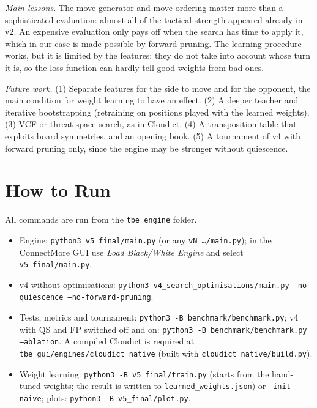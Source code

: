 \documentclass[a4paper,10pt,twocolumn]{article}
\newcommand{\code}[1]{\texttt{#1}}
\begin{document}
\emph{Main lessons.} The move generator and move ordering matter more than a sophisticated evaluation: almost all of the tactical strength appeared already in v2. An expensive evaluation only pays off when the search has time to apply it, which in our case is made possible by forward pruning. The learning procedure works, but it is limited by the features: they do not take into account whose turn it is, so the loss function can hardly tell good weights from bad ones.

\emph{Future work.} (1) Separate features for the side to move and for the opponent, the main condition for weight learning to have an effect. (2) A deeper teacher and iterative bootstrapping (retraining on positions played with the learned weights). (3) VCF or threat-space search, as in Cloudict. (4) A transposition table that exploits board symmetries, and an opening book. (5) A tournament of v4 with forward pruning only, since the engine may be stronger without quiescence.




\appendix
\section{How to Run}
\raggedright
All commands are run from the \code{tbe\_engine} folder.
\begin{itemize}\itemsep0pt
\item Engine: \code{python3 v5\_final/main.py} (or any \code{vN\_\ldots/main.py}); in the ConnectMore GUI use \emph{Load Black/White Engine} and select \code{v5\_final/main.py}.
\item v4 without optimisations: \code{python3 v4\_search\_optimisations/main.py --no-quiescence --no-forward-pruning}.
\item Tests, metrics and tournament: \code{python3 -B benchmark/benchmark.py}; v4 with QS and FP switched off and on: \code{python3 -B benchmark/benchmark.py --ablation}. A compiled Cloudict is required at \code{tbe\_gui/engines/cloudict\_native} (built with \code{cloudict\_native/build.py}).
\item Weight learning: \code{python3 -B v5\_final/train.py} (starts from the hand-tuned weights; the result is written to \code{learned\_weights.json}) or \code{--init naive}; plots: \code{python3 -B v5\_final/plot.py}.
\end{itemize}
\end{document}
